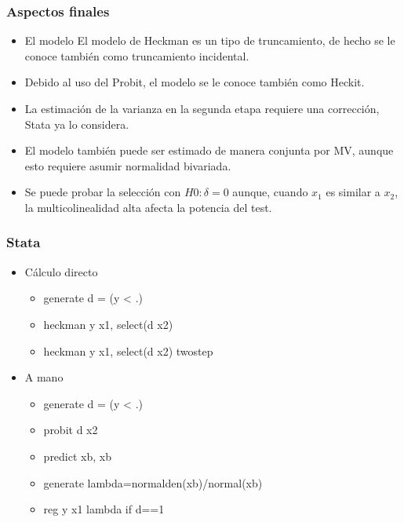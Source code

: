 \begin{frame}[fragile]
	\frametitle{Aspectos finales}
	
	
	\begin{itemize}
		\item El modelo El modelo de Heckman es un tipo de truncamiento, de hecho se le conoce también como truncamiento incidental.
		\item Debido al uso del Probit, el modelo se le conoce también como Heckit.
		\item La estimación de la varianza en la segunda etapa requiere una corrección, Stata ya lo considera.
		\item El modelo también puede ser estimado de manera conjunta por MV, aunque esto requiere asumir normalidad bivariada.
		\item Se puede probar la selección con $H0: \delta=0$ aunque, cuando $x_1$ es similar a $x_2$, la multicolinealidad alta afecta la potencia del test.
	\end{itemize}
	
\end{frame}
\begin{frame}[fragile]
	\frametitle{Stata}
	
	\begin{itemize}
		\item Cálculo directo
		\begin{itemize}
			\item generate d = (y < .)
			\item heckman y x1, select(d x2)
			\item heckman y x1, select(d x2) twostep
		\end{itemize}
		\item A mano
		\begin{itemize}
			\item generate d = (y < .)
			\item probit d x2
			\item predict xb, xb
			\item generate lambda=normalden(xb)/normal(xb)
			\item reg y x1 lambda if d==1
		\end{itemize}	
	\end{itemize}		
\end{frame}